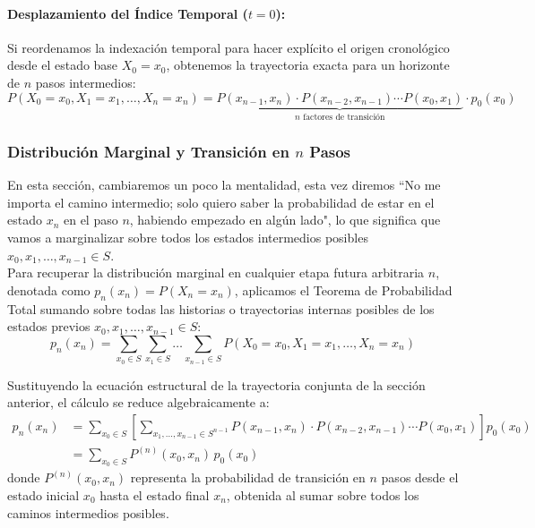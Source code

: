 \paragraph{Desplazamiento del Índice Temporal ($t=0$):}
Si reordenamos la indexación temporal para hacer explícito el origen cronológico desde el estado base $X_0 = x_0$, obtenemos la trayectoria exacta para un horizonte de $n$ pasos intermedios:
\begin{equation*}
    P(X_0 = x_0, X_1 = x_1, \dots, X_n = x_n) = \underbrace{P(x_{n-1}, x_n) \cdot P(x_{n-2}, x_{n-1}) \cdots P(x_0, x_1)}_{n \text{ factores de transición}} \cdot p_0(x_0)
\end{equation*}

\subsubsection{Distribución Marginal y Transición en $n$ Pasos}
\noindent
En esta sección, cambiaremos un poco la mentalidad, esta vez diremos ``No me importa el camino intermedio; solo quiero saber la probabilidad de estar en el estado $x_n$ en el paso $n$, habiendo empezado en algún lado", lo que significa que vamos a marginalizar sobre todos los estados intermedios posibles $x_0, x_1, \dots, x_{n-1} \in S$. \\

\noindent
Para recuperar la distribución marginal en cualquier etapa futura arbitraria $n$, denotada como $p_n(x_n) = P(X_n = x_n)$, aplicamos el Teorema de Probabilidad Total sumando sobre todas las historias o trayectorias internas posibles de los estados previos $x_0, x_1, \dots, x_{n-1} \in S$:
\begin{equation*}
    p_n(x_n) = \sum_{x_0 \in S} \sum_{x_1 \in S} \dots \sum_{x_{n-1} \in S} P(X_0 = x_0, X_1 = x_1, \dots, X_n = x_n)
\end{equation*}

\noindent Sustituyendo la ecuación estructural de la trayectoria conjunta de la sección anterior, el cálculo se reduce algebraicamente a:
\begin{align*}
    p_n(x_n) &= \sum_{x_0 \in S} \left[ \sum_{x_1, \dots, x_{n-1} \in S^{n-1}} P(x_{n-1}, x_n) \cdot P(x_{n-2}, x_{n-1}) \cdots P(x_0, x_1) \right] p_0(x_0) \nonumber \\
    &= \sum_{x_0 \in S} P^{(n)}(x_0, x_n) \, p_0(x_0)
\end{align*}
donde $P^{(n)}(x_0, x_n)$ representa la probabilidad de transición en $n$ pasos desde el estado inicial $x_0$ hasta el estado final $x_n$, obtenida al sumar sobre todos los caminos intermedios posibles. \\

